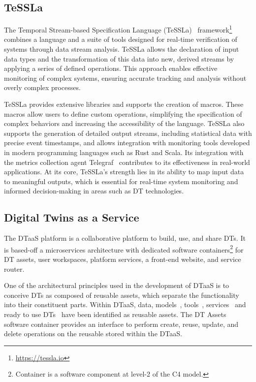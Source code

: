 \subsection{TeSSLa}
The Temporal Stream-based Specification Language (TeSSLa)~\cite{convent2018tessla} framework\footnote{\url{https://tessla.io}} combines a language and a suite of tools designed for real-time verification of systems through data stream analysis. TeSSLa allows the declaration of input data types and the transformation of this data into new, derived streams by applying a series of defined operations. This approach enables effective monitoring of complex systems, ensuring accurate tracking and analysis without overly complex processes.

TeSSLa provides extensive libraries and supports the creation of macros. These macros allow users to define custom operations, simplifying the specification of complex behaviors and increasing the accessibility of the language. TeSSLa also supports the generation of detailed output streams, including statistical data with precise event timestamps, and allows integration with monitoring tools developed in modern programming languages such as Rust and Scala. Its integration with the metrics collection agent Telegraf~\cite{TT-Connector} contributes to its effectiveness in real-world applications.
At its core, TeSSLa's strength lies in its ability to map input data to meaningful outputs, which is essential for real-time system monitoring and informed decision-making in areas such as DT technologies.

\subsection{Digital Twins as a Service}
The DTaaS platform is a collaborative platform to build, use, and share DTs.
It is based-off a microservices architecture with dedicated software containers\footnote{Container is a software component at level-2 of the C4 model.} for DT assets, user workspaces, platform services, a front-end website, and service router.

One of the architectural principles used in the development of DTaaS is to conceive DTs as composed of reusable assets, which separate the functionality into their constituent parts.
Within DTaaS, data, models~\cite{Zambrano&22}, tools~\cite{qi2021enabling}, services~\cite{budiardjo2021digital,robles2023opentwins} and ready to use DTs~\cite{aziz2023distributed} have been identified as reusable assets.
The DT Assets software container provides an interface to perform create, reuse, update, and delete operations on the reusable stored within the DTaaS.

